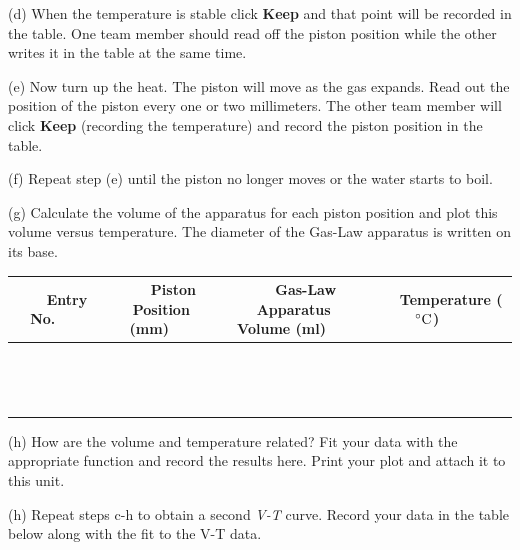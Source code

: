 (d) When the temperature is stable click {\bf Keep} and that point will be recorded in the
table. One team member should read off the piston position while the other 
writes it in the table at the same time.

(e) Now turn up the heat. The piston will move as the gas expands.
Read out the position of the piston every one or two millimeters. The other team member
will click {\bf Keep} (recording the temperature) and record the piston position
in the table.

(f) Repeat step (e) until the piston no longer moves or the water starts to boil.
 
(g) Calculate the volume of the apparatus for each piston position and plot
this volume versus temperature. The diameter of the Gas-Law apparatus is written on its
base.

\vspace{0.3cm}
{\centering \begin{tabular}{|c|c|c|c|}
\hline 
~~~Entry No.~~~&
~~~Piston Position (mm)~~~&
~~~Gas-Law Apparatus Volume (ml)~~~&
~~~Temperature ($^\circ  \rm C$)~~~\\
\hline
\hline 
&
&
&
\\
\hline 
&
&
&
\\
\hline 
&
&
&
\\
\hline 
&
&
&
\\
\hline 
&
&
&
\\
\hline 
&
&
&
\\
\hline 
&
&
&
\\
\hline 
&
&
&
\\
\hline 
&
&
&
\\
\hline
&
&
&
\\
\hline
&
&
&
\\
\hline
&
&
&
\\
\hline
&
&
&
\\
\hline
&
&
&
\\
\hline
\end{tabular}\par}
\vspace{0.3cm}

(h) How are the volume and temperature related?
Fit your data with the appropriate function and record the results here.
Print your plot and attach it to this unit.
\vspace{15mm}

\pagebreak
(h) Repeat steps c-h to obtain a second {\it V-T} curve. Record your data in the table below
along with the fit to the V-T data.
\vspace{30mm}


